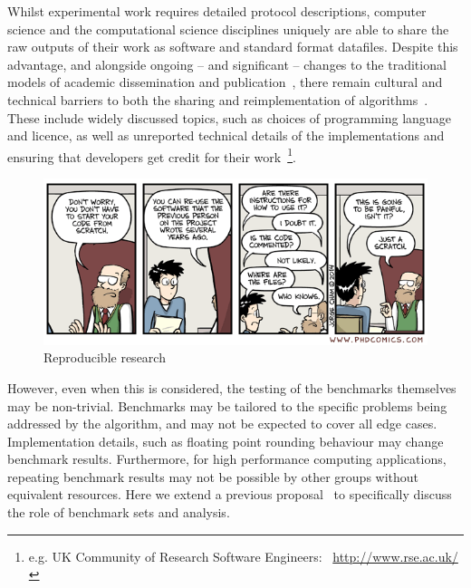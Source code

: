 \documentclass[conference]{IEEEtran}
\begin{document}
Whilst experimental work requires detailed protocol descriptions,
computer science and the computational science disciplines uniquely
are able to share the raw outputs of their work as software and
standard format datafiles. Despite this advantage, and alongside
ongoing -- and significant -- changes to the traditional models of
academic dissemination and
publication~\cite{deroure:2010,stodden-et-al:2013,fursin+dubach:2014},
there remain cultural and technical barriers to both the sharing and
reimplementation of algorithms~\cite{crick-et-al_wssspe2}. These
include widely discussed topics, such as choices of programming
language and licence, as well as unreported technical details of the
implementations and ensuring that developers get credit for their
work~\footnote{e.g. UK Community of Research Software Engineers:
  ~\url{http://www.rse.ac.uk/}}.


\begin{figure}[!ht]
\centering
\includegraphics[width=\columnwidth]{phd031214s.png}
\caption{Reproducible research\newline [source: \url{http://www.phdcomics.com/comics.php?f=1689}]}
\label{fig:reprodres} 
\end{figure}

However, even when this is considered, the testing of the benchmarks
themselves may be non-trivial. Benchmarks may be tailored to the 
specific problems being addressed by the algorithm, and may not be 
expected to cover all edge cases. Implementation details, such as 
floating point rounding behaviour may change benchmark results.
Furthermore, for high performance computing applications, repeating
benchmark results may not be possible by other groups without equivalent
resources. Here we extend a previous proposal~\cite{crick-et-al_wssspe2}
to specifically discuss the role of benchmark sets and analysis.
\end{document}
